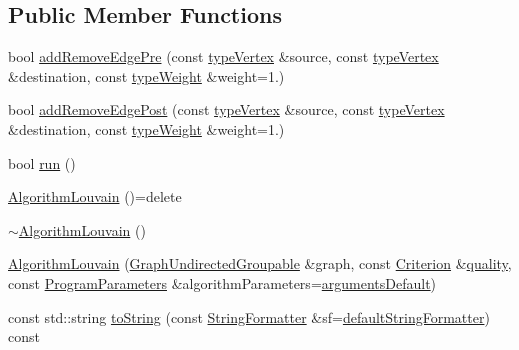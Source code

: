\subsection*{Public Member Functions}
\begin{DoxyCompactItemize}
\item 
bool \hyperlink{classAlgorithmLouvain_a883c922bf2f3c3aadb9db4962c0d8dce}{add\+Remove\+Edge\+Pre} (const \hyperlink{edge_8h_a5fbd20c46956d479cb10afc9855223f6}{type\+Vertex} \&source, const \hyperlink{edge_8h_a5fbd20c46956d479cb10afc9855223f6}{type\+Vertex} \&destination, const \hyperlink{edge_8h_a2e7ea3be891ac8b52f749ec73fee6dd2}{type\+Weight} \&weight=1.)
\item 
bool \hyperlink{classAlgorithmLouvain_a69f296749859441c8a3844753bdd58e5}{add\+Remove\+Edge\+Post} (const \hyperlink{edge_8h_a5fbd20c46956d479cb10afc9855223f6}{type\+Vertex} \&source, const \hyperlink{edge_8h_a5fbd20c46956d479cb10afc9855223f6}{type\+Vertex} \&destination, const \hyperlink{edge_8h_a2e7ea3be891ac8b52f749ec73fee6dd2}{type\+Weight} \&weight=1.)
\item 
bool \hyperlink{classAlgorithmLouvain_a0a72b9dda25c69d19996dc7448924c13}{run} ()
\item 
\hyperlink{classAlgorithmLouvain_ada8cb9a0c018ca6d5162b1b533ad400c}{Algorithm\+Louvain} ()=delete
\item 
\hyperlink{classAlgorithmLouvain_af39d19eff13dc68f4f5ef3a113c361e1}{$\sim$\+Algorithm\+Louvain} ()
\item 
\hyperlink{classAlgorithmLouvain_a44cd235ecff85b3896fe5d30e0b5da9a}{Algorithm\+Louvain} (\hyperlink{classGraphUndirectedGroupable}{Graph\+Undirected\+Groupable} \&graph, const \hyperlink{classCriterion}{Criterion} \&\hyperlink{classAlgorithmLouvain_a8c9b7694fff17eb5d8044cd26d7914e7}{quality}, const \hyperlink{structProgramParameters}{Program\+Parameters} \&algorithm\+Parameters=\hyperlink{program_8h_ae2d819404495f80f31db7676c1329d19}{arguments\+Default})
\item 
const std\+::string \hyperlink{classAlgorithmLouvain_a2df60c50eb63b783ba0e9e77226bebee}{to\+String} (const \hyperlink{classStringFormatter}{String\+Formatter} \&sf=\hyperlink{stringFormatter_8h_abf1349c8e24162d0134072aff288f2a2}{default\+String\+Formatter}) const
\end{DoxyCompactItemize}

